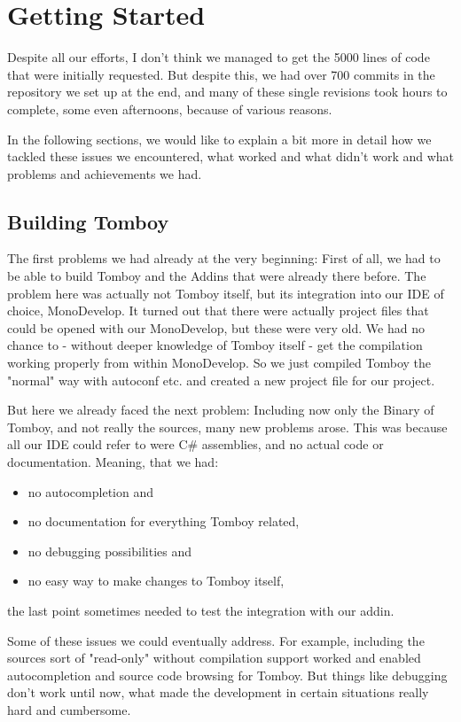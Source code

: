 \section{Getting Started} \label{beginning}

Despite all our efforts, I don't think we managed to get the 5000 lines of code that were initially requested. But despite this, we had over 700 commits in the repository we set up at the end, and many of these single revisions took hours to complete, some even afternoons, because of various reasons.

In the following sections, we would like to explain a bit more in detail how we tackled these issues we encountered, what worked and what didn't work and what problems and achievements we had.

\subsection{Building Tomboy}
\label{building_tomboy}
The first problems we had already at the very beginning: First of all, we had to be able to build Tomboy and the Addins that were already there before. The problem here was actually not Tomboy itself, but its integration into our IDE of choice, MonoDevelop. It turned out that there were actually project files that could be opened with our MonoDevelop, but these were very old. We had no chance to - without deeper knowledge of Tomboy itself - get the compilation working properly from within MonoDevelop. So we just compiled Tomboy the "normal" way with autoconf etc. and created a new project file for our project.

But here we already faced the next problem: Including now only the Binary of Tomboy, and not really the sources, many new problems arose. This was because all our IDE could refer to were C\# assemblies, and no actual code or documentation. Meaning, that we had:
\begin{itemize}
\item no autocompletion and
\item no documentation for everything Tomboy related,
\item no debugging possibilities and
\item no easy way to make changes to Tomboy itself,
\end{itemize}
the last point sometimes needed to test the integration with our addin.

Some of these issues we could eventually address. For example, including the sources sort of "read-only" without compilation support worked and enabled autocompletion and source code browsing for Tomboy. But things like debugging don't work until now, what made the development in certain situations really hard and cumbersome.

